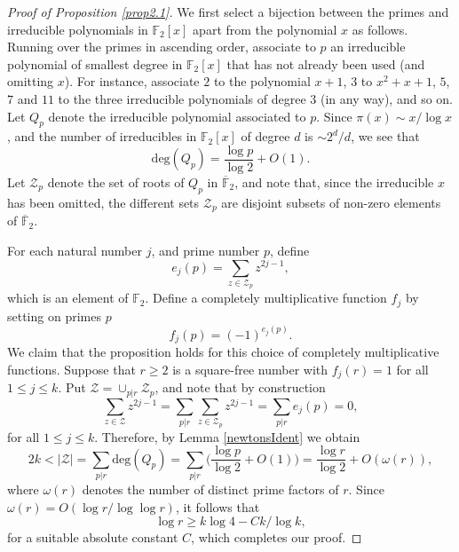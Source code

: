 \documentclass[11pt,makeidx, reqno]{amsart}
\theoremstyle{mystyle}
\theoremstyle{definition}
\begin{document}
\begin{proof}[Proof of Proposition \ref{prop2.1}]   We first select a bijection between the primes and irreducible polynomials in ${\mathbb F}_2[x]$ apart from the polynomial $x$ as follows.  Running over the primes in ascending order, associate to $p$ an irreducible polynomial of smallest degree in ${\mathbb F}_2[x]$ that has not already been used (and omitting $x$).  For instance, associate $2$ to the polynomial $x+1$, $3$ to $x^2+x+1$, $5$, $7$ and $11$ to the three irreducible polynomials of degree $3$ (in any way), and so on.  Let $Q_p$ denote the irreducible polynomial associated to $p$.  Since $\pi(x) \sim x/\log x$, and the number of irreducibles in ${\mathbb F}_2[x]$ of degree $d$ is $\sim 2^d/d$, we see that 
$$ 
\text{deg}(Q_p) = \frac{\log p}{\log 2} + O(1). 
$$
Let ${\mathcal Z}_p$ denote the set of roots of $Q_p$ in $\overline{\mathbb F}_2$, and note that, since the irreducible $x$ has been omitted, the different sets ${\mathcal Z}_p$ are disjoint subsets of non-zero elements of $\overline{\mathbb F}_2$.  

For each natural number $j$, and prime number $p$, define 
$$
e_j(p) = \sum_{z\in {\mathcal Z}_p} z^{2j-1},  
$$
which is an element of ${\mathbb F}_2$.   Define a completely multiplicative function $f_j$ by setting on primes $p$
$$ 
f_j(p) = (-1)^{e_j(p)}.  
$$
We claim that the proposition holds for this choice of completely multiplicative functions.  Suppose that $r\ge 2$ is a square-free number with $f_j(r)=1$ for all $1\le j\le k$.  Put ${\mathcal Z} =\cup_{p|r} {\mathcal Z}_p$, and note that by construction 
$$
\sum_{z\in \mathcal{Z}} z^{2j-1} = \sum_{p|r} \sum_{z\in \mathcal{Z}_p} z^{2j-1} = \sum_{p|r} e_j(p) = 0, 
$$
for all $1\le j\le k$.   Therefore, by Lemma \ref{newtonsIdent} we obtain 
$$ 
2k < |{\mathcal Z}| = \sum_{p|r} \text{deg} (Q_p) = \sum_{p|r} \Big(\frac{\log p}{\log 2} + O(1)\Big) = \frac{\log r}{\log 2} + O(\omega(r)),  
$$
where $\omega(r)$ denotes the number of distinct prime factors of $r$.  Since $\omega(r) =O(\log r/\log \log r)$, it follows that 
$$ 
\log r \ge k\log 4 - Ck/\log k,
$$
for a suitable absolute constant $C$, which completes our proof. 
\end{proof}
 
\end{document}
